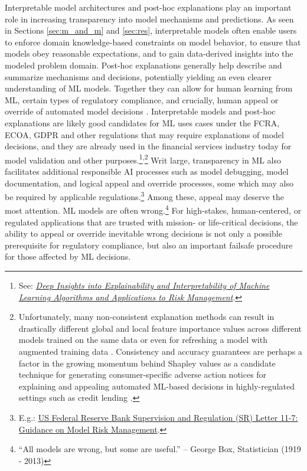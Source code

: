 \documentclass[information,article,submit,moreauthors,pdftex]{definitions/mdpi}
\begin{document}
{Interpretable model architectures and post-hoc explanations play an important role in increasing transparency into model mechanisms and predictions. As seen in Sections \ref{sec:m_and_m} and \ref{sec:res}, interpretable models often enable users to enforce domain knowledge-based constraints on model behavior, to ensure that models obey reasonable expectations, and to gain data-derived insights into the modeled problem domain. Post-hoc explanations generally help describe and summarize mechanisms and decisions, potentially yielding an even clearer understanding of ML models. Together they can allow for human learning from ML, certain types of regulatory compliance, and crucially, human appeal or override of automated model decisions \cite{art_and_sci}. Interpretable models and post-hoc explanations are likely good candidates for ML uses cases under the FCRA, ECOA, GDPR and other regulations that may require explanations of model decisions, and they are already used in the financial services industry today for model validation and other purposes.\footnote{See: \href{https://ww2.amstat.org/meetings/jsm/2019/onlineprogram/AbstractDetails.cfm?abstractid=303053}{\textit{Deep Insights into Explainability and Interpretability of Machine Learning Algorithms and Applications to Risk Management}}.}\textsuperscript{,}\footnote{Unfortunately, many non-consistent explanation methods can result in drastically different global and local feature importance values across different models trained on the same data or even for refreshing a model with augmented training data \cite{molnar}. Consistency and accuracy guarantees are perhaps a factor in the growing momentum behind Shapley values as a candidate technique for generating consumer-specific adverse action notices for explaining and appealing automated ML-based decisions in highly-regulated settings such as credit lending \cite{bracke2019machine}.} Writ large, transparency in ML also facilitates additional responsible AI processes such as model debugging, model documentation, and logical appeal and override processes, some which may also be required by applicable regulations.\footnote{E.g.: \href{https://www.federalreserve.gov/supervisionreg/srletters/sr1107.htm}{US Federal Reserve Bank Supervision and Regulation (SR) Letter 11-7: Guidance on Model Risk Management}.} Among these, appeal may deserve the most attention. ML models are often wrong.\footnote{``All models are wrong, but some are useful.'' -- George Box, Statistician (1919 - 2013)} For high-stakes, human-centered, or regulated applications that are trusted with mission- or life-critical decisions, the ability to appeal or override inevitable wrong decisions is not only a possible prerequisite for regulatory compliance, but also an important failsafe procedure for those affected by ML decisions.  

}
\end{document}
